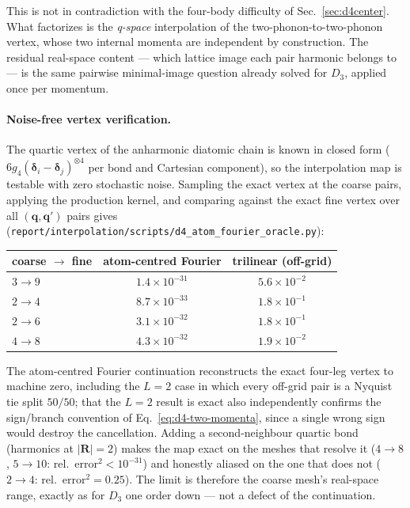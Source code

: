 \documentclass[11pt,a4paper]{article}
\newcommand{\qv}{\mathbf{q}}
\newcommand{\Rv}{\mathbf{R}}
\begin{document}
This is not in contradiction with the four-body difficulty of
Sec.~\ref{sec:d4center}.  What factorizes is the \emph{q-space}
interpolation of the two-phonon-to-two-phonon vertex, whose two internal
momenta are independent by construction.  The residual real-space content
--- which lattice image each pair harmonic belongs to --- is the same
pairwise minimal-image question already solved for $D_3$, applied once per
momentum.

\paragraph{Noise-free vertex verification.}
The quartic vertex of the anharmonic diatomic chain is known in closed
form ($6g_4(\boldsymbol\delta_i-\boldsymbol\delta_j)^{\otimes4}$ per bond and Cartesian
component), so the interpolation map is testable with zero stochastic
noise.  Sampling the exact vertex at the coarse pairs, applying the
production kernel, and comparing against the exact fine vertex over all
$(\qv,\qv')$ pairs gives
(\texttt{report/interpolation/scripts/d4\_atom\_fourier\_oracle.py}):
\begin{center}
\small
\begin{tabular}{lcc}
\toprule
coarse $\to$ fine & atom-centred Fourier & trilinear (off-grid) \\
\midrule
$3\to9$ & $1.4\times10^{-31}$ & $5.6\times10^{-2}$ \\
$2\to4$ & $8.7\times10^{-33}$ & $1.8\times10^{-1}$ \\
$2\to6$ & $3.1\times10^{-32}$ & $1.8\times10^{-1}$ \\
$4\to8$ & $4.3\times10^{-32}$ & $1.9\times10^{-2}$ \\
\bottomrule
\end{tabular}
\end{center}
The atom-centred Fourier continuation reconstructs the exact four-leg
vertex to machine zero, including the $L=2$ case in which every off-grid
pair is a Nyquist tie split $50/50$; that the $L=2$ result is exact also
independently confirms the sign/branch convention of
Eq.~\eqref{eq:d4-two-momenta}, since a single wrong sign would destroy the
cancellation.  Adding a second-neighbour quartic bond (harmonics at
$|\Rv|=2$) makes the map exact on the meshes that resolve it
($4\to8$, $5\to10$: rel.\ error$^2<10^{-31}$) and honestly aliased on the
one that does not ($2\to4$: rel.\ error$^2=0.25$).  The limit is
therefore the coarse mesh's real-space range, exactly as for $D_3$ one
order down --- not a defect of the continuation.
\end{document}
